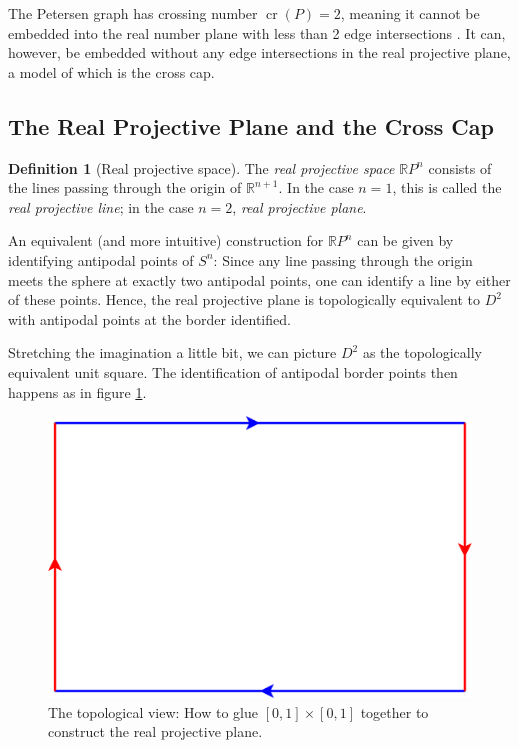 \documentclass[11pt,            %
               a4paper,         %
               oneside,         %
               DIV12,           %
               fleqn,           %
               halfparskip,     %
               nochapterprefix, %
              ]{scrartcl} %
\theoremstyle{definition}
\newtheorem{definition}{Definition}
\begin{document}
The Petersen graph has crossing number $\operatorname{cr}(P) = 2$,
meaning it cannot be embedded into the real number plane with less than 2 edge
intersections \cite[p.~2]{crossingnr}. It can, however, be embedded
without any edge intersections in the real projective plane, a model
of which is the cross cap.

\subsection{The Real Projective Plane and the Cross Cap}

\begin{definition}[Real projective space]
  The \emph{real projective space} $\mathbb{R}P^n$ consists of the lines
  passing through the origin of $\mathbb{R}^{n+1}$. In the case $n=1$,
  this is called the \emph{real projective line}; in the case $n=2$,
  \emph{real projective plane}.
\end{definition}
%
\begin{minipage}{0.55\textwidth}
  An equivalent (and more intuitive) construction for $\mathbb{R}P^n$
  can be given by identifying antipodal points of $S^n$: Since any
  line passing through the origin meets the sphere at exactly two
  antipodal points, one can identify a line by either of these points.
  Hence, the real projective plane is topologically equivalent to
  $D^2$ with antipodal points at the border identified.

  Stretching the imagination a little bit, we can picture $D^2$ as the
  topologically equivalent unit square. The identification of
  antipodal border points then happens as in figure \ref{fig:rp2}.
\end{minipage}%
\hfill%
\begin{minipage}{0.35\textwidth}
  \begin{figure}[H]
    \centering
    \includegraphics[keepaspectratio=true,width=\textwidth]{../planar-graphs/crosscap-construction.pdf}
    \caption{The topological view: How to glue $[0,1]\times[0,1]$
      together to construct the real projective plane.}
    \label{fig:rp2}
  \end{figure}
\end{minipage}%
\end{document}
